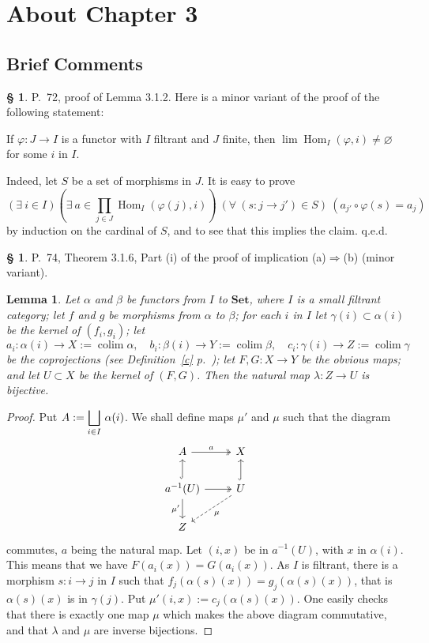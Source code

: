 \documentclass[12pt]{article}%
\newtheorem{lem}[thm]{Lemma}
\theoremstyle{remark}
\theoremstyle{definition}
\newtheorem{s}[thm]{\S}%
\newcommand{\Set}{\mathbf{Set}}%
\newcommand{\pp}{\varphi}
\newcommand{\then}{\Rightarrow}
\DeclareMathOperator*{\colim}{colim}%
\DeclareMathOperator{\Hom}{Hom}%
\begin{document}

\section{About Chapter 3}

\subsection{Brief Comments}

\begin{s} 
P.~72, proof of Lemma 3.1.2. Here is a minor variant of the proof of the following statement: 

If $\pp:J\to I$ is a functor with $I$ filtrant and $J$ finite, then $\lim\Hom_I(\pp,i)\neq\varnothing$ for some $i$ in $I$. 

Indeed, let $S$ be a set of morphisms in $J$. It is easy to prove 
$$
(\exists\ i\in I)\left(\exists\ a\in\prod_{j\in J}\Hom_I(\pp(j),i)\right)\ (\forall\ (s:j\to j')\in S)\ (a_{j'}\circ\pp(s)=a_j) 
$$ 
by induction on the cardinal of $S$, and to see that this implies the claim. q.e.d.
\end{s}

%

\begin{s} 
P.~74, Theorem 3.1.6, Part (i) of the proof of implication (a)$\then$(b) (minor variant). 
%
\begin{lem} 
Let $\alpha$ and $\beta$ be functors from $I$ to $\Set$, where $I$ is a small filtrant category; let $f$ and $g$ be morphisms from $\alpha$ to $\beta$; for each $i$ in $I$ let $\gamma(i)\subset\alpha(i)$ be the kernel of $(f_i,g_i)$; let 
$$
a_i:\alpha(i)\to X:=\colim\alpha,\quad 
b_i:\beta(i)\to Y:=\colim\beta,\quad 
c_i:\gamma(i)\to Z:=\colim\gamma
$$ 
be the coprojections (see Definition~\ref{c} p.~\pageref{c}); let $F,G:X\to Y$ be the obvious maps; and let $U\subset X$ be the kernel of $(F,G)$. Then the natural map $\lambda:Z\to U$ is bijective.
\end{lem}
%
\begin{proof}
Put $\displaystyle A:=\bigsqcup_{i\in I}\,\alpha(i)$. We shall define maps $\mu'$ and $\mu$ such that the diagram
$$
\begin{tikzcd}
A\ar[two heads]{r}{a}&X\\ 
a^{-1}(U)\ar[hook]{u}\ar{d}[swap]{\mu'}\ar[two heads]{r}&U\ar[hook]{u}\ar[dashed]{dl}{\mu}\\ 
Z
\end{tikzcd}
$$ 
commutes, $a$ being the natural map. Let $(i,x)$ be in $a^{-1}(U)$, with $x$ in $\alpha(i)$. This means that we have $F(a_i(x))=G(a_i(x))$. As $I$ is filtrant, there is a morphism $s:i\to j$ in $I$ such that $f_j(\alpha(s)(x))=g_j(\alpha(s)(x))$, that is $\alpha(s)(x)$ is in $\gamma(j)$. Put $\mu'(i,x):=c_j(\alpha(s)(x))$. One easily checks that there is exactly one map $\mu$ which makes the above diagram commutative, and that $\lambda$ and $\mu$ are inverse bijections.
\end{proof}
\end{s}
\end{document}
